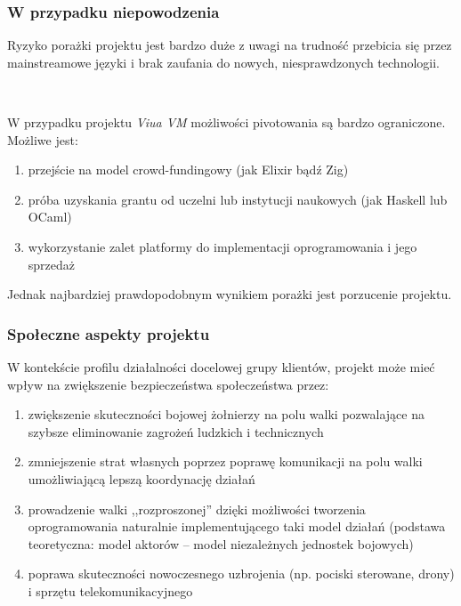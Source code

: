 \documentclass[aspectratio=169]{beamer}
\begin{document}
\begin{frame}
    \frametitle{W przypadku niepowodzenia}

    Ryzyko porażki projektu jest bardzo duże z uwagi na trudność przebicia się
    przez mainstreamowe języki i brak zaufania do nowych, niesprawdzonych
    technologii.

    ~

    W przypadku projektu \emph{Viua VM} możliwości pivotowania są bardzo
    ograniczone. Możliwe jest:

    \begin{enumerate}
        \item przejście na model crowd-fundingowy (jak Elixir bądź Zig)
        \item próba uzyskania grantu od uczelni lub instytucji naukowych (jak
            Haskell lub OCaml)
        \item wykorzystanie zalet platformy do implementacji oprogramowania i
            jego sprzedaż
    \end{enumerate}
    Jednak najbardziej prawdopodobnym wynikiem porażki jest porzucenie projektu.
\end{frame}

\begin{frame}
    \frametitle{Społeczne aspekty projektu}

    W kontekście profilu działalności docelowej grupy klientów, projekt może
    mieć wpływ na zwiększenie bezpieczeństwa społeczeństwa przez:

    \begin{enumerate}
        \item zwiększenie skuteczności bojowej żołnierzy na polu walki
            pozwalające na szybsze eliminowanie zagrożeń ludzkich i technicznych
        \item zmniejszenie strat własnych poprzez poprawę komunikacji na polu
            walki umożliwiającą lepszą koordynację działań
        \item prowadzenie walki ,,rozproszonej'' dzięki możliwości tworzenia
            oprogramowania naturalnie implementującego taki model działań
            (podstawa teoretyczna: model aktorów -- model niezależnych jednostek
            bojowych)
        \item poprawa skuteczności nowoczesnego uzbrojenia (np. pociski
            sterowane, drony) i sprzętu telekomunikacyjnego
    \end{enumerate}
\end{frame}
\end{document}
